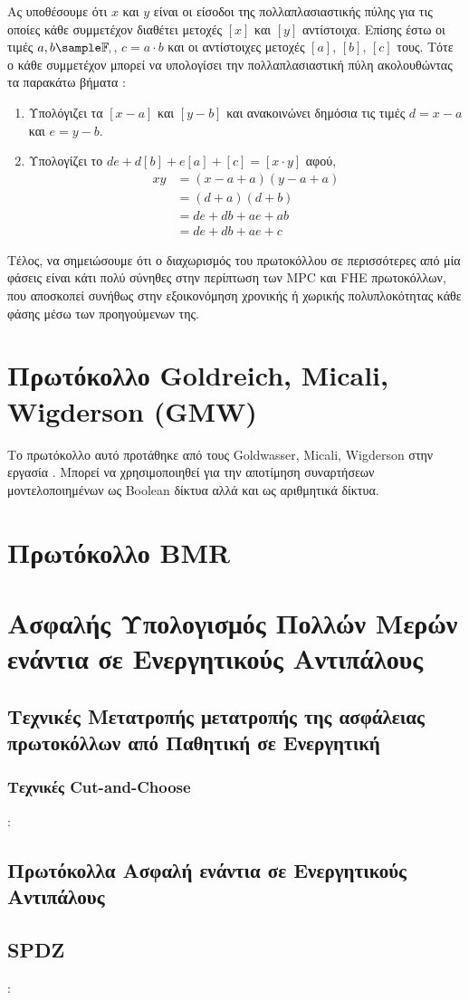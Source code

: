 Ας υποθέσουμε ότι $x$ και $y$ είναι οι είσοδοι της πολλαπλασιαστικής πύλης για τις οποίες κάθε συμμετέχον διαθέτει μετοχές $[x]$ και $[y]$ αντίστοιχα. Επίσης έστω οι τιμές $a, b \sample \mathbb{F_p}$, $c=a \cdot b$ και οι αντίστοιχες μετοχές $[a]$, $[b]$, $[c]$ τους. Τότε ο κάθε συμμετέχον μπορεί να υπολογίσει την πολλαπλασιαστική πύλη ακολουθώντας τα παρακάτω βήματα :

\begin{enumerate}
    \item Υπολόγιζει τα $[x - a]$ και $[y - b]$ και ανακοινώνει δημόσια τις τιμές $d = x - a$ και $e = y - b$.
    \item Υπολογίζει το $de + d[b] + e[a] + [c] = [x \cdot y]$ αφού,
    \begin{align}
        xy &= (x - a + a)(y - a + a) \\
           &= (d + a)(d + b) \\
           &= de + db + ae + ab \\
           &= de + db + ae + c
    \end{align}
\end{enumerate}

Τέλος, να σημειώσουμε ότι ο διαχωρισμός του πρωτοκόλλου σε περισσότερες από μία φάσεις είναι κάτι πολύ σύνηθες στην περίπτωση των MPC και FHE πρωτοκόλλων, που αποσκοπεί συνήθως στην εξοικονόμηση  χρονικής ή χωρικής πολυπλοκότητας κάθε φάσης μέσω των προηγούμενων της.

\section{Πρωτόκολλο Goldreich, Micali, Wigderson (GMW)}
Το πρωτόκολλο αυτό προτάθηκε από τους Goldwasser, Micali, Wigderson στην εργασία . Μπορεί να χρησιμοποιηθεί για την αποτίμηση συναρτήσεων μοντελοποιημένων ως Boolean δίκτυα αλλά και ως αριθμητικά δίκτυα.

\section{Πρωτόκολλο BMR}

\section{Ασφαλής Υπολογισμός Πολλών Μερών ενάντια σε Ενεργητικούς Αντιπάλους}

\subsection{Τεχνικές Μετατροπής μετατροπής της ασφάλειας πρωτοκόλλων από Παθητική σε Ενεργητική}

\subsubsection{Τεχνικές Cut-and-Choose} :

\subsection{Πρωτόκολλα Ασφαλή ενάντια σε Ενεργητικούς Αντιπάλους}

\subsection{SPDZ} :
